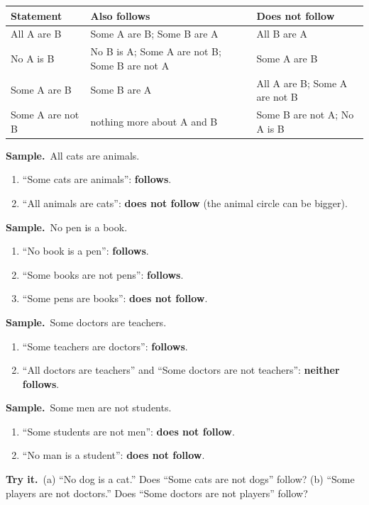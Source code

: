 \documentclass[11pt,a4paper]{article}
\newif\ifkeepsamp
\newcommand{\samp}{\ifkeepsamp\needspace{4\baselineskip}\fi\textbf{\color{ember}Sample.}\ }
\newcommand{\tryit}[1]{\textbf{\color{ember}Try it.}\ #1}
\begin{document}
\begin{center}\small\renewcommand{\arraystretch}{1.18}\setlength{\tabcolsep}{8pt}
\begin{tabularx}{\linewidth}{@{}l >{\raggedright\arraybackslash}X >{\raggedright\arraybackslash}X@{}}
\toprule
\textbf{\color{slate}Statement} & \textbf{\color{slate}Also follows} & \textbf{\color{slate}Does not follow} \\ \midrule
All A are B & Some A are B; Some B are A & All B are A \\
No A is B & No B is A; Some A are not B; Some B are not A & Some A are B \\
Some A are B & Some B are A & All A are B; Some A are not B \\
Some A are not B & nothing more about A and B & Some B are not A; No A is B \\
\bottomrule
\end{tabularx}\end{center}

\samp All cats are animals.
\begin{enumerate}
\item ``Some cats are animals'': \textbf{follows}.
\item ``All animals are cats'': \textbf{does not follow} (the animal circle can be bigger).
\end{enumerate}
\samp No pen is a book.
\begin{enumerate}
\item ``No book is a pen'': \textbf{follows}.
\item ``Some books are not pens'': \textbf{follows}.
\item ``Some pens are books'': \textbf{does not follow}.
\end{enumerate}
\samp Some doctors are teachers.
\begin{enumerate}
\item ``Some teachers are doctors'': \textbf{follows}.
\item ``All doctors are teachers'' and ``Some doctors are not teachers'': \textbf{neither follows}.
\end{enumerate}
\samp Some men are not students.
\begin{enumerate}
\item ``Some students are not men'': \textbf{does not follow}.
\item ``No man is a student'': \textbf{does not follow}.
\end{enumerate}

\tryit (a) ``No dog is a cat.'' Does ``Some cats are not dogs'' follow? (b) ``Some players are not doctors.'' Does ``Some doctors are not players'' follow?
\end{document}
